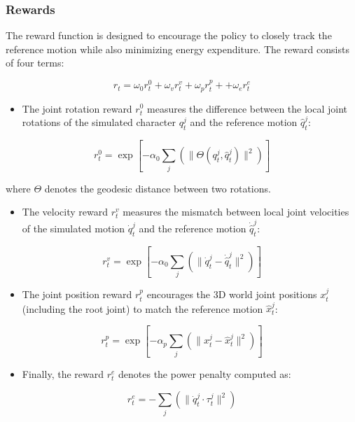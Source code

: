 \documentclass{article}
\begin{document}
\subsubsection{Rewards}\label{rewards}

The reward function is designed to encourage the policy to closely track the reference motion while also minimizing energy expenditure. The reward consists of four terms:

\[r_t = \omega_0 r_t^0 + \omega_v r_t^v + \omega_p r_t^p + + \omega_e r_t^e\]

\begin{itemize}
\tightlist
\item
  The joint rotation reward $r_t^0$ measures the difference between the local joint rotations of the simulated character $q_t^{j}$ and the reference motion $\hat{q}_t^{j}$:
\end{itemize}

\[ r_t^0 = \exp \left[ -\alpha_0 \sum_j \left( \| \Theta (q_t^{j}, \hat{q}_t^{j}) \|^2 \right) \right]\]

where $\Theta$ denotes the geodesic distance between two rotations.

\begin{itemize}
\tightlist
\item
  The velocity reward $r_t^v$ measures the mismatch between local joint velocities of the simulated motion $\dot{q}_t^{j}$ and the reference motion $\dot{\hat{q}}_t^{j}$:
\end{itemize}

\[ r_t^v = \exp \left[ -\alpha_0 \sum_j \left( \| \dot{q}_t^{j} - \dot{\hat{q}}_t^{j} \|^2 \right) \right]\]

\begin{itemize}
\tightlist
\item
  The joint position reward $r_t^p$ encourages the 3D world joint positions $x_t^{j}$ (including the root joint) to match the reference motion $\hat{x}_t^{j}$:
\end{itemize}

\[ r_t^p = \exp \left[ -\alpha_p \sum_j \left( \| x_t^{j} - \hat{x}_t^{j} \|^2 \right) \right]\]

\begin{itemize}
\tightlist
\item
  Finally, the reward $r_t^e$ denotes the power penalty computed as:
\end{itemize}

\[ r_t^e = -\sum_j \left( \| \dot{q}_t^{j} \cdot \tau_t^{j} \|^2 \right)\]
\end{document}
